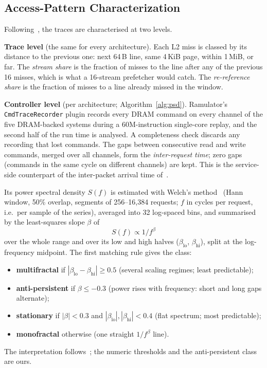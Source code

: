 \documentclass[12pt]{article}
\begin{document}
\subsection{Access-Pattern Characterization}
Following~\cite{agarwal2025}, the traces are characterised at two levels.

\textbf{Trace level} (the same for every architecture). Each L2 miss is classed by its distance to the previous one: next 64\,B line, same 4\,KiB page, within 1\,MiB, or far. The \emph{stream share} is the fraction of misses to the line after any of the previous 16 misses, which is what a 16-stream prefetcher would catch. The \emph{re-reference share} is the fraction of misses to a line already missed in the window.

\textbf{Controller level} (per architecture; Algorithm~\ref{alg:psd}). Ramulator's \texttt{CmdTraceRecorder} plugin records every DRAM command on every channel of the five DRAM-backed systems during a 60M-instruction single-core replay, and the second half of the run time is analysed. A completeness check discards any recording that lost commands. The gaps between consecutive read and write commands, merged over all channels, form the \emph{inter-request time}; zero gaps (commands in the same cycle on different channels) are kept. This is the service-side counterpart of the inter-packet arrival time of~\cite{agarwal2025}.

Its power spectral density $S(f)$ is estimated with Welch's method~\cite{welch1967} (Hann window, 50\% overlap, segments of 256--16,384 requests; $f$ in cycles per request, i.e.\ per sample of the series), averaged into 32 log-spaced bins, and summarised by the least-squares slope $\beta$ of
\begin{equation}
S(f) \propto 1/f^{\beta}
\end{equation}
over the whole range and over its low and high halves ($\beta_{\mathrm{lo}}$, $\beta_{\mathrm{hi}}$), split at the log-frequency midpoint. The first matching rule gives the class:
\begin{itemize}
\item \textbf{multifractal} if $|\beta_{\mathrm{lo}}-\beta_{\mathrm{hi}}|\ge0.5$ (several scaling regimes; least predictable);
\item \textbf{anti-persistent} if $\beta\le-0.3$ (power rises with frequency: short and long gaps alternate);
\item \textbf{stationary} if $|\beta|<0.3$ and $|\beta_{\mathrm{lo}}|,|\beta_{\mathrm{hi}}|<0.4$ (flat spectrum; most predictable);
\item \textbf{monofractal} otherwise (one straight $1/f^{\beta}$ line).
\end{itemize}
The interpretation follows~\cite{agarwal2025}; the numeric thresholds and the anti-persistent class are ours.
\end{document}
